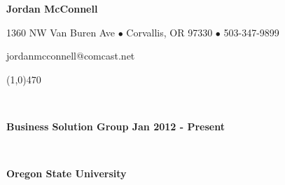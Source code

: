 \documentclass[11pt]{article}
\makeatletter
\newcommand{\Name}{Jordan McConnell}
\newcommand{\Address}{1360 NW Van Buren Ave}
\newcommand{\City}{Corvallis}
\newcommand{\State}{OR}
\newcommand{\Zipcode}{97330}
\newcommand{\PhoneNumber}{503-347-9899}
\newcommand{\EmailAddress}{jordanmcconnell@comcast.net}
\makeatother
\begin{document}
\centerline{{\LARGE \bf \Name{} }}
\centerline{\Address{} $\bullet$ \City{}, \State{} \Zipcode{} $\bullet$ \PhoneNumber{}}
\centerline{\EmailAddress{}}
\noindent
\line(1,0){470}

\smallskip

\noindent


\bigskip
{}
\\
\smallskip
\centerline{{\large \bf Business Solution Group \hfill Jan 2012 - Present}}

\bigskip
{}
\\
\smallskip
\centerline{{\large \bf Oregon State University}}
\end{document}
